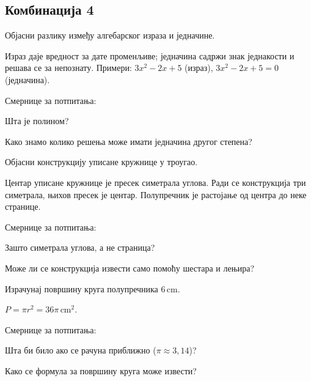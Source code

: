 \documentclass[12pt]{exam}
\begin{document}
\subsection*{Комбинација 4}
\begin{questions}
\question Објасни разлику између алгебарског израза и једначине. 
\begin{solution}
Израз даје вредност за дате променљиве; једначина садржи знак једнакости и решава се за непознату.  
Примери: $3x^2-2x+5$ (израз), $3x^2-2x+5=0$ (једначина).

Смернице за потпитања:
  \par Шта је полином? 
  \par Како знамо колико решења може имати једначина другог степена?
\end{solution}

\question Објасни конструкцију уписане кружнице у троугао.
\begin{solution}
Центар уписане кружнице је пресек симетрала углова. Ради се конструкција три симетрала, њихов пресек је центар. Полупречник је растојање од центра до неке странице.

Смернице за потпитања:
  \par Зашто симетрала углова, а не страница?
  \par Може ли се конструкција извести само помоћу шестара и лењира?
\end{solution}

\question Израчунај површину круга полупречника $6\,\mathrm{cm}$.
\begin{solution}
$P=\pi r^2=36\pi\,\mathrm{cm}^2$.

Смернице за потпитања:
  \par Шта би било ако се рачуна приближно ($\pi\approx3{,}14$)?
  \par Како се формула за површину круга може извести?
\end{solution}
\end{questions}

\ifprintanswers\newpage\else\fi

\end{document}
